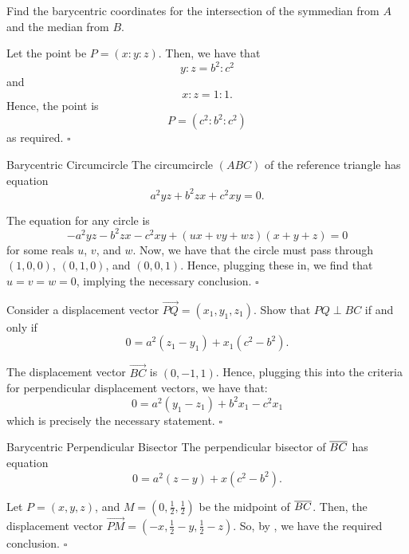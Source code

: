 \documentclass{article}
\begin{document}
\begin{problem}[7.9]{}
Find the barycentric coordinates for the intersection of the symmedian from $A$ and the median from $B$.
\end{problem}
Let the point be $P = (x : y : z)$. Then, we have that \[y : z = b^2 : c^2\] and \[x : z = 1 : 1.\] Hence, the point is \[P = \boxed{(c^2 : b^2 : c^2)}\] as required. $\square$

\begin{problem}[7.17]{Barycentric Circumcircle}
The circumcircle $(ABC)$ of the reference triangle has equation \[a^2yz + b^2zx + c^2xy = 0.\]
\end{problem}
The equation for any circle is \[-a^2yz-b^2zx-c^2xy+(ux+vy+wz)(x+y+z) = 0\] for some reals $u$, $v$, and $w$. Now, we have that the circle must pass through $(1, 0, 0)$, $(0, 1, 0)$, and $(0, 0, 1)$. Hence, plugging these in, we find that $u = v = w = 0$, implying the necessary conclusion. $\square$

\begin{problem}[7.18]{}
Consider a displacement vector $\overrightarrow{PQ} = (x_1, y_1, z_1)$. Show that $PQ \perp BC$ if and only if \[0 = a^2(z_1 - y_1) + x_1(c^2 - b^2).\]
\end{problem}
The displacement vector $\overrightarrow{BC}$ is $(0, -1, 1)$. Hence, plugging this into the criteria for perpendicular displacement vectors, we have that: \[0 = a^2(y_1-z_1)+b^2x_1-c^2x_1\] which is precisely the necessary statement. $\square$

\begin{problem}[7.19]{Barycentric Perpendicular Bisector}
The perpendicular bisector of $\overline{BC}$ has equation \[0 = a^2(z - y) + x(c^2 - b^2).\]
\end{problem}

Let $P = (x, y, z)$, and $M = \left(0, \tfrac{1}{2}, \tfrac{1}{2}\right)$ be the midpoint of $\overline{BC}$. Then, the displacement vector $\overrightarrow{PM} = \left(-x, \tfrac{1}{2}-y, \tfrac{1}{2}-z\right)$. So, by , we have the required conclusion. $\square$
\end{document}
